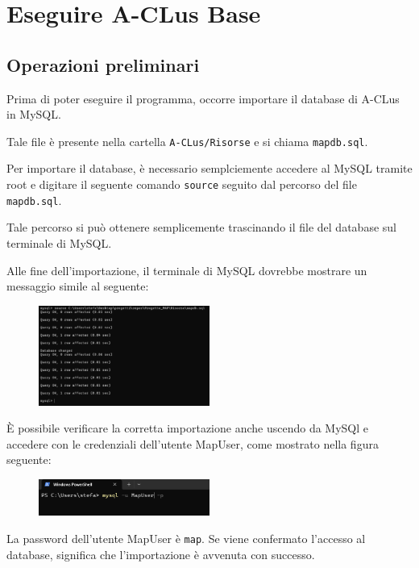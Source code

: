 \section{Eseguire A-CLus Base}

\subsection*{Operazioni preliminari}

Prima di poter eseguire il programma, occorre importare il database di A-CLus in MySQL. 

Tale file è presente nella cartella \texttt{A-CLus/Risorse} e si chiama \texttt{mapdb.sql}. 

Per importare il database, è necessario semplciemente accedere al MySQL tramite root e digitare il seguente comando \texttt{source} seguito dal percorso del file \texttt{mapdb.sql}. 

Tale percorso si può ottenere semplicemente trascinando il file del database sul terminale di MySQL.

Alle fine dell'importazione, il terminale di MySQL dovrebbe mostrare un messaggio simile al seguente:

\begin{figure}[h!]
    \centering
    \includegraphics[width=0.5\textwidth]{images/import mysql.png}
\end{figure}

È possibile verificare la corretta importazione anche uscendo da MySQl e accedere con le credenziali dell'utente MapUser, come mostrato nella figura seguente:

\begin{figure}[h!]
    \centering
    \includegraphics[width=0.5\textwidth]{images/import mapdb.png}
\end{figure}

La password dell'utente MapUser è \texttt{map}. Se viene confermato l'accesso al database, significa che l'importazione è avvenuta con successo. 

